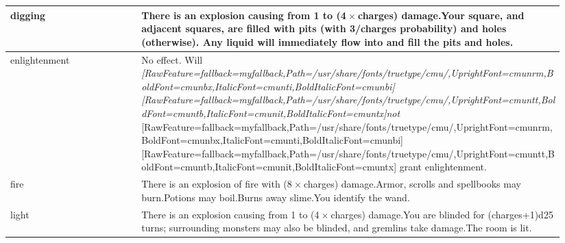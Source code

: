 \begin{longtable}{|>{\RaggedRight}p{0.22451\linewidth}|>{\RaggedRight}p{0.71835\linewidth}|}
\hspace*{0pt}\ignorespaces{}\hspace*{0pt}digging&\hspace*{0pt}\ignorespaces{}\hspace*{0pt}There is an explosion causing from 1 to (4{\mbox{$~$}}{\mbox{$\times$}}{\mbox{$~$}}charges) damage.\newline{}Your square, and adjacent squares, are filled with pits (with 3/charges probability) and holes (otherwise). Any liquid will immediately flow into and fill the pits and holes.\\ \hline \hspace*{0pt}\ignorespaces{}\hspace*{0pt}enlightenment&\hspace*{0pt}\ignorespaces{}\hspace*{0pt}No effect. Will {\itshape \allowbreak{}\setmainfont{cmunti.ttf}[RawFeature={fallback=myfallback},Path=/usr/share/fonts/truetype/cmu/,UprightFont=cmunrm,BoldFont=cmunbx,ItalicFont=cmunti,BoldItalicFont=cmunbi]\setmonofont{cmunti.ttf}[RawFeature={fallback=myfallback},Path=/usr/share/fonts/truetype/cmu/,UprightFont=cmuntt,BoldFont=cmuntb,ItalicFont=cmunit,BoldItalicFont=cmuntx]\itshape not}{$\text{ }$}\allowbreak{}\setmainfont{cmunrm.ttf}[RawFeature={fallback=myfallback},Path=/usr/share/fonts/truetype/cmu/,UprightFont=cmunrm,BoldFont=cmunbx,ItalicFont=cmunti,BoldItalicFont=cmunbi]\setmonofont{cmunrm.ttf}[RawFeature={fallback=myfallback},Path=/usr/share/fonts/truetype/cmu/,UprightFont=cmuntt,BoldFont=cmuntb,ItalicFont=cmunit,BoldItalicFont=cmuntx] grant enlightenment.\\ \hline \hspace*{0pt}\ignorespaces{}\hspace*{0pt}fire&\hspace*{0pt}\ignorespaces{}\hspace*{0pt}There is an explosion of fire with (8{\mbox{$~$}}{\mbox{$\times$}}{\mbox{$~$}}charges) damage.\newline{}Armor, scrolls and spellbooks may burn.\newline{}Potions may boil.\newline{}Burns away slime.\newline{}You identify the wand.\\ \hline \hspace*{0pt}\ignorespaces{}\hspace*{0pt}light&\hspace*{0pt}\ignorespaces{}\hspace*{0pt}There is an explosion causing from 1 to (4{\mbox{$~$}}{\mbox{$\times$}}{\mbox{$~$}}charges) damage.\newline{}You are blinded for (charges+1)d25 turns; surrounding monsters may also be blinded, and gremlins take damage.\newline{}The room is lit.\\ \hline 
\end{longtable}
